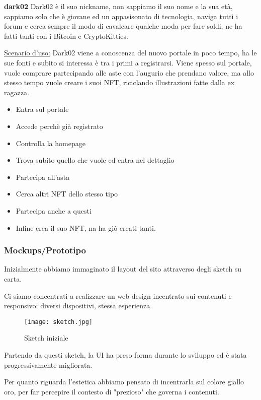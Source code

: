 \bigbreak
\noindent
\textbf{dark02}
\bigbreak
\noindent
Dark02 è il suo nickname, non sappiamo il suo nome e la sua età, sappiamo solo che è giovane ed un appasisonato di tecnologia,
naviga tutti i forum e cerca sempre il modo di cavalcare qualche moda per fare soldi, 
ne ha fatti tanti con i Bitcoin e CryptoKitties.

\underline{Scenario d'uso:}
Dark02 viene a conoscenza del nuovo portale in poco tempo, ha le sue fonti e subito si interessa è tra i primi a registrarsi.
Viene spesso sul portale, vuole comprare partecipando alle aste con l'augurio che prendano valore, ma allo stesso tempo vuole creare i suoi NFT, 
riciclando illustrazioni fatte dalla ex ragazza.

\begin{itemize}
	\item Entra sul portale
	\item Accede perchè già registrato
	\item Controlla la homepage
	\item Trova subito quello che vuole ed entra nel dettaglio
	\item Partecipa all'asta
	\item Cerca altri NFT dello stesso tipo
	\item Partecipa anche a questi
	\item Infine crea il suo NFT, na ha giò creati tanti.
\end{itemize}

\clearpage

\subsubsection{Mockups/Prototipo}
Inizialmente abbiamo immaginato il layout del sito attraverso degli sketch su carta.

Ci siamo concentrati a realizzare un web design incentrato sui contenuti e responsivo: diversi dispositivi, stessa esperienza.

\begin{figure}[H]
	\centering
	\texttt{[image: sketch.jpg]}
	\caption{Sketch iniziale}
	\label{fig:sketch}
\end{figure}

Partendo da questi sketch, la UI ha preso forma durante lo sviluppo ed è stata progressivamente migliorata.

Per quanto riguarda l'estetica abbiamo pensato di incentrarla sul colore giallo oro, 
per far percepire il contesto di "prezioso" che governa i contenuti.

